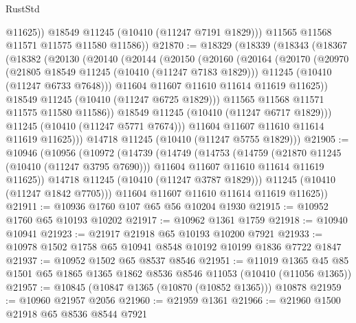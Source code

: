 \begin{lexlean}{RustStd}
\begin{coremodule}
              @11625))
          @18549
          @11245
          (@10410 (@11247 @7191 @1829)))
        @11565
        @11568
        @11571
        @11575
        @11580
        @11586))
@21870 := @18329
    (@18339
      (@18343
        (@18367
          (@18382
            (@20130
              (@20140
                (@20144
                  (@20150
                    (@20160
                      (@20164
                        (@20170
                          (@20970
                            (@21805 @18549 @11245 (@10410 (@11247 @7183 @1829)))
                            @11245
                            (@10410 (@11247 @6733 @7648)))
                          @11604
                          @11607
                          @11610
                          @11614
                          @11619
                          @11625))
                      @18549
                      @11245
                      (@10410 (@11247 @6725 @1829)))
                    @11565
                    @11568
                    @11571
                    @11575
                    @11580
                    @11586))
                @18549
                @11245
                (@10410 (@11247 @6717 @1829)))
              @11245
              (@10410 (@11247 @5771 @7674)))
            @11604
            @11607
            @11610
            @11614
            @11619
            @11625)))
      @14718
      @11245
      (@10410 (@11247 @5755 @1829)))
@21905 := @10946
    (@10956
      (@10972
        (@14739
          (@14749
            (@14753
              (@14759
                (@21870 @11245 (@10410 (@11247 @3795 @7690)))
                @11604
                @11607
                @11610
                @11614
                @11619
                @11625))
            @14718
            @11245
            (@10410 (@11247 @3787 @1829)))
          @11245
          (@10410 (@11247 @1842 @7705)))
        @11604
        @11607
        @11610
        @11614
        @11619
        @11625))
@21911 := @10936 @1760 @107 @65 @56 @10204 @1930
@21915 := @10952 @1760 @65 @10193 @10202
@21917 := @10962 @1361 @1759
@21918 := @10940 @10941
@21923 := @21917 @21918 @65 @10193 @10200 @7921
@21933 := @10978 @1502 @1758 @65 @10941 @8548 @10192 @10199 @1836 @7722 @1847
@21937 := @10952 @1502 @65 @8537 @8546
@21951 := @11019
    @1365
    @45
    @85
    @1501
    @65
    @1865
    @1365
    @1862
    @8536
    @8546
    @11053
    (@10410 (@11056 @1365))
@21957 := @10845 (@10847 @1365 (@10870 (@10852 @1365))) @10878
@21959 := @10960 @21957 @2056
@21960 := @21959 @1361
@21966 := @21960 @1500 @21918 @65 @8536 @8544 @7921

\end{coremodule}
\end{lexlean}
